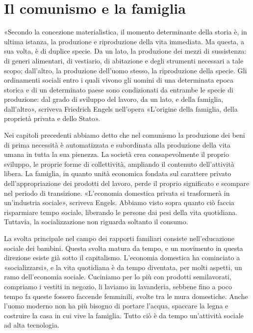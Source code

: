 \documentclass[../main]{subfiles}
\begin{document}
\ifSubfilesClassLoaded{\setcounter{page}{50}}{}
\section{Il comunismo e la famiglia}
\label{sec:09_comunismo_famiglia}

«Secondo la concezione materialistica, il momento determinante della storia è, in ultima istanza, la produzione e riproduzione della vita immediata. Ma questa, a sua volta, è di duplice specie. Da un lato, la produzione dei mezzi di sussistenza: di generi alimentari, di vestiario, di abitazione e degli strumenti necessari a tale scopo; dall'altro, la produzione dell'uomo stesso, la riproduzione della specie. Gli ordinamenti sociali entro i quali vivono gli uomini di una determinata epoca storica e di un determinato paese sono condizionati da entrambe le specie di produzione: dal grado di sviluppo del lavoro, da un lato, e della famiglia, dall'altro», scriveva Friedrich Engels nell'opera «L'origine della famiglia, della proprietà privata e dello Stato».

Nei capitoli precedenti abbiamo detto che nel comunismo la produzione dei beni di prima necessità è automatizzata e subordinata alla produzione della vita umana in tutta la sua pienezza. La società crea consapevolmente il proprio sviluppo, le proprie forme di collettività, ampliando il contenuto dell'attività libera. La famiglia, in quanto unità economica fondata sul carattere privato dell'appropriazione dei prodotti del lavoro, perde il proprio significato e scompare nel periodo di transizione. «L'economia domestica privata si trasformerà in un'industria sociale», scriveva Engels. Abbiamo visto sopra quanto ciò faccia risparmiare tempo sociale, liberando le persone dai pesi della vita quotidiana. Tuttavia, la socializzazione non riguarda soltanto il consumo.

La svolta principale nel campo dei rapporti familiari consiste nell'educazione sociale dei bambini. Questa svolta matura da tempo, e un movimento in questa direzione esiste già sotto il capitalismo. L'economia domestica ha cominciato a «socializzarsi», e la vita quotidiana è da tempo diventata, per molti aspetti, un ramo dell'economia sociale. Cuciniamo per lo più con prodotti semilavorati, compriamo i vestiti in negozio, li laviamo in lavanderia, sebbene fino a poco tempo fa queste fossero faccende femminili, svolte tra le mura domestiche. Anche l'uomo moderno non ha più bisogno di portare l'acqua, spaccare la legna e costruire la casa in cui vive la famiglia. Tutto ciò è da tempo un'attività sociale ad alta tecnologia.
\end{document}
